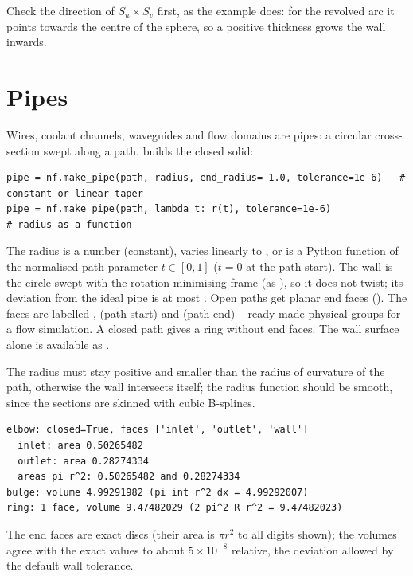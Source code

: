 Check the direction of $S_u\times S_v$ first, as the example does: for the revolved arc it
points towards the centre of the sphere, so a positive thickness grows the wall inwards.

\section{Pipes}\label{sec:pipes}

Wires, coolant channels, waveguides and flow domains are pipes: a circular cross-section swept
along a path.  builds the closed solid:

\begin{lstlisting}
pipe = nf.make_pipe(path, radius, end_radius=-1.0, tolerance=1e-6)   # constant or linear taper
pipe = nf.make_pipe(path, lambda t: r(t), tolerance=1e-6)             # radius as a function
\end{lstlisting}

The radius is a number (constant), varies linearly to , or is a Python function
of the normalised path parameter $t\in[0,1]$ ($t=0$ at the path start). The wall is the circle
swept with the rotation-minimising frame (as ), so it does not twist; its
deviation from the ideal pipe is at most . Open paths get planar end faces
(). The faces are labelled ,  (path start) and
 (path end) -- ready-made physical groups for a flow simulation. A closed path
gives a ring without end faces. The wall surface alone is available as
.

The radius must stay positive and smaller than the radius of curvature of the path, otherwise
the wall intersects itself; the radius function should be smooth, since the sections are
skinned with cubic B-splines.


\begin{lstlisting}[style=text]
elbow: closed=True, faces ['inlet', 'outlet', 'wall']
  inlet: area 0.50265482
  outlet: area 0.28274334
  areas pi r^2: 0.50265482 and 0.28274334
bulge: volume 4.99291982 (pi int r^2 dx = 4.99292007)
ring: 1 face, volume 9.47482029 (2 pi^2 R r^2 = 9.47482023)
\end{lstlisting}

The end faces are exact discs (their area is $\pi r^2$ to all digits shown); the volumes agree
with the exact values to about $5\times10^{-8}$ relative, the deviation allowed by the default
wall tolerance.

